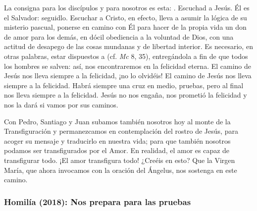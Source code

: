 \begin{body}
La consigna para los discípulos y para nosotros es esta: . Escuchad a Jesús. Él es el Salvador: seguidlo. Escuchar a Cristo, en efecto, lleva a asumir la lógica de su misterio pascual, ponerse en camino con Él para hacer de la propia vida un don de amor para los demás, en dócil obediencia a la voluntad de Dios, con una actitud de desapego de las cosas mundanas y de libertad interior. Es necesario, en otras palabras, estar dispuestos a  (cf. \textit{Mc} 8, 35), entregándola a fin de que todos los hombres se salven: así, nos encontraremos en la felicidad eterna. El camino de Jesús nos lleva siempre a la felicidad, ¡no lo olvidéis! El camino de Jesús nos lleva siempre a la felicidad. Habrá siempre una cruz en medio, pruebas, pero al final nos lleva siempre a la felicidad. Jesús no nos engaña, nos prometió la felicidad y nos la dará si vamos por sus caminos.

Con Pedro, Santiago y Juan subamos también nosotros hoy al monte de la Transfiguración y permanezcamos en contemplación del rostro de Jesús, para acoger su mensaje y traducirlo en nuestra vida; para que también nosotros podamos ser transfigurados por el Amor. En realidad, el amor es capaz de transfigurar todo. ¡El amor transfigura todo! ¿Creéis en esto? Que la Virgen María, que ahora invocamos con la oración del Ángelus, nos sostenga en este camino.
\end{body}


\label{b2-03-02-2015A}
\newpage

\subsubsection{Homilía (2018): Nos prepara para las pruebas}


